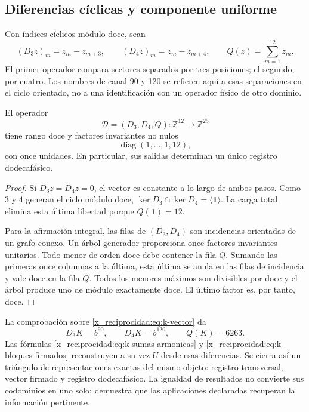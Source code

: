 \subsection{Diferencias cíclicas y componente uniforme}
\label{x_reciprocidad:subsec:k-transversal}

Con índices cíclicos módulo doce, sean
\[
 (D_3z)_m=z_m-z_{m+3},\qquad(D_4z)_m=z_m-z_{m+4},
 \qquad Q(z)=\sum_{m=1}^{12}z_m.
\]
El primer operador compara sectores separados por tres posiciones; el
segundo, por cuatro. Los nombres de canal 90 y 120 se refieren aquí a
esas separaciones en el ciclo orientado, no a una identificación con un
operador físico de otro dominio.

\begin{proposition}
\label{x_reciprocidad:prop:k-transversal}
El operador
\[
 \mathcal D=(D_3,D_4,Q):\mathbb Z^{12}\longrightarrow\mathbb Z^{25}
\]
tiene rango doce y factores invariantes no nulos
\[
 \operatorname{diag}(1,\ldots,1,12),
\]
con once unidades. En particular, sus salidas determinan un único registro dodecafásico.
\end{proposition}

\begin{proof}
Si \(D_3z=D_4z=0\), el vector es constante a lo largo de ambos pasos.
Como \(3\) y \(4\) generan el ciclo módulo doce,
\(\ker D_3\cap\ker D_4=\langle\mathbf1\rangle\). La carga total
elimina esta última libertad porque \(Q(\mathbf1)=12\).

Para la afirmación integral, las filas de \((D_3,D_4)\) son incidencias
orientadas de un grafo conexo. Un árbol generador proporciona once
factores invariantes unitarios. Todo menor de orden doce debe contener la
fila \(Q\). Sumando las primeras once columnas a la última, esta última
se anula en las filas de incidencia y vale doce en la fila \(Q\). Todos
los menores máximos son divisibles por doce y el árbol produce uno de
módulo exactamente doce. El último factor es, por tanto, doce.
\end{proof}

La comprobación sobre \eqref{x_reciprocidad:eq:k-vector} da
\[
 D_3K=b^{90},\qquad D_4K=b^{120},\qquad Q(K)=6263.
\]
Las fórmulas \eqref{x_reciprocidad:eq:k-sumas-armonicas} y
\eqref{x_reciprocidad:eq:k-bloques-firmados} reconstruyen a su vez \(U\) desde esas
diferencias. Se cierra así un triángulo de representaciones exactas del
mismo objeto: registro transversal, vector firmado y registro dodecafásico. La igualdad
de resultados no convierte sus codominios en uno solo; demuestra que
las aplicaciones declaradas recuperan la información pertinente.


